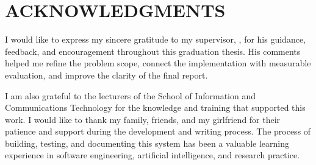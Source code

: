 \chapter*{ACKNOWLEDGMENTS}
I would like to express my sincere gratitude to my supervisor, \supervisorname, for his guidance, feedback, and encouragement throughout this graduation thesis. His comments helped me refine the problem scope, connect the implementation with measurable evaluation, and improve the clarity of the final report.

I am also grateful to the lecturers of the School of Information and Communications Technology for the knowledge and training that supported this work. I would like to thank my family, friends, and my girlfriend for their patience and support during the development and writing process. The process of building, testing, and documenting this system has been a valuable learning experience in software engineering, artificial intelligence, and research practice.
\clearpage
